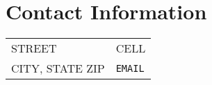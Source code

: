 \section{\sc Contact Information} %
\vspace{.05in}
\begin{tabular}{@{}p{2.8in}p{2.8in}}
STREET                                   & CELL \\
CITY, STATE ZIP                          & \texttt{EMAIL}\\        
\end{tabular}
